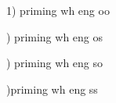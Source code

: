 \documentclass{article}
\begin{document}

1) priming wh eng oo

\begin{center}

\end{center}

) priming wh eng  os
\begin{center}

\end{center}

) priming wh eng  so
\begin{center}

\end{center}

)priming wh eng  ss
\begin{center}

\end{center}
\end{document}
